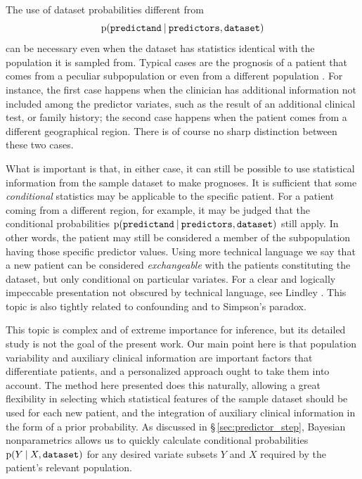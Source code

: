\documentclass[a4paper,12pt,%
onecolumn,oneside,article,%
british%
]{memoir}
\theoremstyle{remark}
\theoremstyle{innote}
\newcommand*{\p}{\mathrm{p}}%
\renewcommand*{\|}[1][]{\nonscript\:#1\vert\nonscript\:\mathopen{}}
\newcommand*{\sect}{\S}%
\newcommand*{\sects}{\S\S}%
\newcommand*{\chap}{ch.}%
\newcommand*{\predictors}{\texttt{predictors}}
\newcommand*{\predictand}{\texttt{predictand}}
\newcommand*{\dataset}{\texttt{dataset}}
\begin{document}
\medskip

The use of dataset probabilities different from $$\p(\predictand \| \predictors, \dataset)$$ can be necessary even when the dataset has statistics identical with the population it is sampled from. Typical cases are the prognosis of a patient that comes from a peculiar subpopulation or even from a different population \autocites{lindleyetal1981}{quintanaetal2017}[\chap~4]{soxetal1988_r2013}[\chap~5]{huninketal2001_r2014}. For instance, the first case happens when the clinician has additional information not included among the predictor variates, such as the result of an additional clinical test, or family history; the second case happens when the patient comes from a different geographical region. There is of course no sharp distinction between these two cases.

What is important is that, in either case, it can still be possible to use statistical information from the sample dataset to make prognoses. It is sufficient that some \emph{conditional} statistics may be applicable to the specific patient. For a patient coming from a different region, for example, it may be judged that the conditional probabilities $\p(\predictand \| \predictors, \dataset)$ still apply. In other words, the patient may still be considered a member of the subpopulation having those specific predictor values. Using more technical language we say that a new patient can be considered \emph{exchangeable} with the patients constituting the dataset, but only conditional on particular variates. For a clear and logically impeccable presentation not obscured by technical language, see Lindley \autocites[especially around \sects~7.3, 8.6]{lindley2006_r2014}{lindleyetal1981}[more technical references are][]{definetti1930,definetti1937,dawid2013}[\sects~4.2--4.3, 4.6]{bernardoetal1994_r2000}. This topic is also tightly related to confounding and to Simpson's paradox\autocites{malinasetal2004_r2016,sprengeretal2021}.

This topic is complex and of extreme importance for inference, but its detailed study is not the goal of the present work. Our main point here is that population variability and auxiliary clinical information are important factors that differentiate patients, and a personalized approach ought to take them into account. The method here presented does this naturally, allowing a great flexibility in selecting which statistical features of the sample dataset should be used for each new patient, and the integration of auxiliary clinical information in the form of a prior probability. As discussed in \sect\,\ref{sec:predictor_step}, Bayesian nonparametrics allows us to quickly calculate conditional probabilities $\p(Y\|X, \dataset)$ for any desired variate subsets $Y$ and $X$ required by the patient's relevant population.
\end{document}
